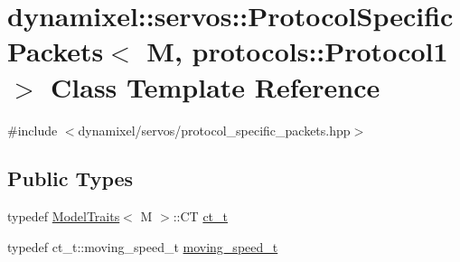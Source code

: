 \hypertarget{classdynamixel_1_1servos_1_1_protocol_specific_packets_3_01_m_00_01protocols_1_1_protocol1_01_4}{}\section{dynamixel\+:\+:servos\+:\+:Protocol\+Specific\+Packets$<$ M, protocols\+:\+:Protocol1 $>$ Class Template Reference}
\label{classdynamixel_1_1servos_1_1_protocol_specific_packets_3_01_m_00_01protocols_1_1_protocol1_01_4}


{\ttfamily \#include $<$dynamixel/servos/protocol\+\_\+specific\+\_\+packets.\+hpp$>$}

\subsection*{Public Types}
\begin{DoxyCompactItemize}
\item 
typedef \hyperlink{structdynamixel_1_1servos_1_1_model_traits}{Model\+Traits}$<$ M $>$\+::CT \hyperlink{classdynamixel_1_1servos_1_1_protocol_specific_packets_3_01_m_00_01protocols_1_1_protocol1_01_4_aaf41bdc8c76f4b48435902cb819a9912}{ct\+\_\+t}
\item 
typedef ct\+\_\+t\+::moving\+\_\+speed\+\_\+t \hyperlink{classdynamixel_1_1servos_1_1_protocol_specific_packets_3_01_m_00_01protocols_1_1_protocol1_01_4_a748789c4170e6821eecc8c6482487fa6}{moving\+\_\+speed\+\_\+t}
\end{DoxyCompactItemize}
